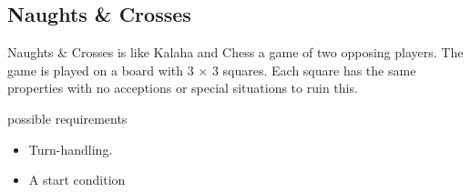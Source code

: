 \subsection{Naughts \& Crosses}

Naughts \& Crosses is like Kalaha and Chess a game of two opposing players. The game is played on a board with 3 $\times$ 3 squares. Each square has the same properties with no acceptions or special situations to ruin this. 

possible requirements
\begin{itemize}
	\item Turn-handling.
	\item A start condition 
\end{itemize}